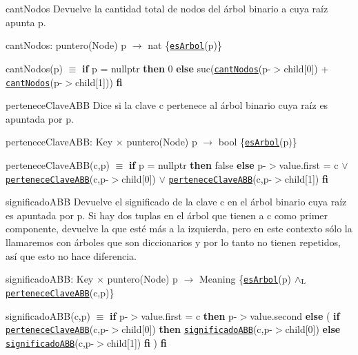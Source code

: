 \begin{DoxyParagraph}{cant\-Nodos}
Devuelve la cantidad total de nodos del árbol binario a cuya raíz apunta p.

cant\-Nodos\-: puntero(\-Node) p $\to$ nat \{\href{axiomas.html#esArbol}{\tt es\-Arbol}(p)\} \par
cant\-Nodos(p) $\equiv$ {\bfseries if} p = nullptr {\bfseries then} 0 {\bfseries else} suc(\href{axiomas.html#cantNodos}{\tt cant\-Nodos}(p-\/$>$child\mbox{[}0\mbox{]}) + \href{axiomas.html#cantNodos}{\tt cant\-Nodos}(p-\/$>$child\mbox{[}1\mbox{]})) {\bfseries fi} 


\end{DoxyParagraph}
\begin{DoxyParagraph}{pertenece\-Clave\-A\-B\-B}
Dice si la clave c pertenece al árbol binario cuya raíz es apuntada por p.

pertenece\-Clave\-A\-B\-B\-: Key $\times$ puntero(\-Node) p $\to$ bool \{\href{axiomas.html#esArbol}{\tt es\-Arbol}(p)\} \par
pertenece\-Clave\-A\-B\-B(c,p) $\equiv$ {\bfseries if} p = nullptr {\bfseries then} false {\bfseries else} p-\/$>$value.\-first = c $\lor$ \href{axiomas.html#perteneceClaveABB}{\tt pertenece\-Clave\-A\-B\-B}(c,p-\/$>$child\mbox{[}0\mbox{]}) $\lor$ \href{axiomas.html#perteneceClaveABB}{\tt pertenece\-Clave\-A\-B\-B}(c,p-\/$>$child\mbox{[}1\mbox{]}) {\bfseries fi} 


\end{DoxyParagraph}
\begin{DoxyParagraph}{significado\-A\-B\-B}
Devuelve el significado de la clave c en el árbol binario cuya raíz es apuntada por p. Si hay dos tuplas en el árbol que tienen a c como primer componente, devuelve la que esté más a la izquierda, pero en este contexto sólo la llamaremos con árboles que son diccionarios y por lo tanto no tienen repetidos, así que esto no hace diferencia.

significado\-A\-B\-B\-: Key $\times$ puntero(\-Node) p $\to$ Meaning \{\href{axiomas.html#esArbol}{\tt es\-Arbol}(p) $\land_{\rm L}$ \href{axiomas.html#perteneceClaveABB}{\tt pertenece\-Clave\-A\-B\-B}(c,p)\} \par
significado\-A\-B\-B(c,p) $\equiv$ {\bfseries if} p-\/$>$value.\-first = c {\bfseries then} p-\/$>$value.\-second {\bfseries else} ( {\bfseries if} \href{axiomas.html#perteneceClaveABB}{\tt pertenece\-Clave\-A\-B\-B}(c,p-\/$>$child\mbox{[}0\mbox{]}) {\bfseries then} \href{axiomas.html#significadoABB}{\tt significado\-A\-B\-B}(c,p-\/$>$child\mbox{[}0\mbox{]}) {\bfseries else} \href{axiomas.html#significadoABB}{\tt significado\-A\-B\-B}(c,p-\/$>$child\mbox{[}1\mbox{]}) {\bfseries fi} ) {\bfseries fi} 


\end{DoxyParagraph}
